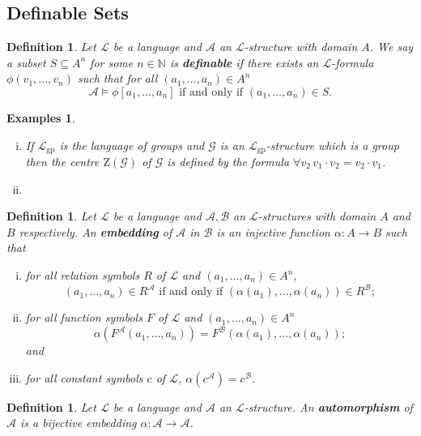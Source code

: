 \documentclass[11pt]{article}
\newtheorem{examples}[theorem]{Examples}
\newtheorem{definition}[theorem]{Definition}
\newcommand{\mcal}[1]{\mathcal{#1}}
\newcommand{\N}{\mathbb{N}}
\begin{document}
\subsection{Definable Sets}

\begin{definition}
Let $\mcal{L}$ be a language and $\mcal{A}$ an $\mcal{L}$-structure with domain $A$. We say a subset $S\subseteq A^n$ for some $n\in \N$ is \textbf{definable} if there exists an $\mcal{L}$-formula $\phi(v_1,\ldots,v_n)$ such that for all $(a_1,\ldots,a_n)\in A^n$ \[\mcal{A}\models\phi[a_1,\ldots,a_n] \text{ if and only if } (a_1,\ldots,a_n)\in S.\]
\end{definition}

\begin{examples}
\begin{enumerate}[(i)]
\item If $\mcal{L}_{\textrm{gp}}$ is the language of groups and $\mcal{G}$ is an $\mcal{L}_{\textrm{gp}}$-structure which is a group then the centre $\textrm{Z}(\mcal{G})$ of $\mcal{G}$ is defined by the formula $\forall v_2 \, v_1\cdot v_2=v_2\cdot v_1$.
\item 
\end{enumerate}
\end{examples}

\begin{definition}
Let $\mcal{L}$ be a language and $\mcal{A},\mcal{B}$ an $\mcal{L}$-structures with domain $A$ and $B$ respectively. An \textbf{embedding} of $\mcal{A}$ in $\mcal{B}$ is an injective function $\alpha:A\rightarrow B$ such that
\begin{enumerate}[(i)]
\item for all relation symbols $R$ of $\mcal{L}$ and $(a_1,\ldots,a_n)\in A^{n}$,
\[(a_1,\ldots,a_n)\in R^{\mcal{A}}\text{ if and only if }(\alpha(a_1),\ldots,\alpha(a_n))\in R^{\mcal{B}};\]
\item for all function symbols $F$ of $\mcal{L}$ and $(a_1,\ldots,a_n)\in A^{n}$
\[\alpha(F^{\mcal{A}}(a_1,\ldots,a_n))=F^\mcal{B}(\alpha(a_1),\ldots,\alpha(a_n));\] and
\item for all constant symbols $c$ of $\mcal{L}$, $\alpha(c^{\mcal{A}})=c^{\mcal{B}}$.
\end{enumerate}
\end{definition}

\begin{definition}
Let $\mcal{L}$ be a language and $\mcal{A}$ an $\mcal{L}$-structure. An \textbf{automorphism} of $\mcal{A}$ is a bijective embedding $\alpha:\mcal{A}\rightarrow \mcal{A}$.
\end{definition}
\end{document}
